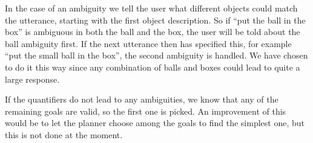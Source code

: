 In the case of an ambiguity we tell the user what different objects could match the utterance, starting with the first object description.
So if ``put the ball in the box'' is ambiguous in both the ball and the box, the user will be told about the ball ambiguity first.
If the next utterance then has specified this, for example ``put the small ball in the box'', the second ambiguity is handled.
We have chosen to do it this way since any combination of balls and boxes could lead to quite a large response.

If the quantifiers do not lead to any ambiguities, we know that any of the remaining goals are valid, so the first one is picked.
An improvement of this would be to let the planner choose among the goals to find the simplest one, but this is not done at the moment.

